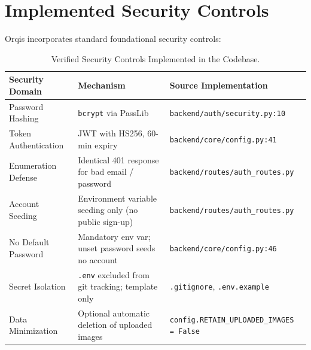 \documentclass[11pt,a4paper]{report}
\newcommand{\artifact}[1]{\nolinkurl{#1}}
\begin{document}
\section{Implemented Security Controls}
Orqis incorporates standard foundational security controls:
\begin{table}[H]
\centering
\small
\setlength{\tabcolsep}{3pt}
\begin{tabularx}{\textwidth}{>{\raggedright\arraybackslash}p{3.0cm} >{\raggedright\arraybackslash}X >{\raggedright\arraybackslash}p{4.2cm}}
\toprule
\textbf{Security Domain} & \textbf{Mechanism} & \textbf{Source Implementation} \\
\midrule
Password Hashing & \texttt{bcrypt} via PassLib & \artifact{backend/auth/security.py:10} \\
Token Authentication & JWT with HS256, 60-min expiry & \artifact{backend/core/config.py:41} \\
Enumeration Defense & Identical 401 response for bad email / password & \artifact{backend/routes/auth\_routes.py} \\
Account Seeding & Environment variable seeding only (no public sign-up) & \artifact{backend/routes/auth\_routes.py} \\
No Default Password & Mandatory env var; unset password seeds no account & \artifact{backend/core/config.py:46} \\
Secret Isolation & \texttt{.env} excluded from git tracking; template only & \artifact{.gitignore}, \artifact{.env.example} \\
Data Minimization & Optional automatic deletion of uploaded images & \artifact{config.RETAIN\_UPLOADED\_IMAGES = False} \\
\bottomrule
\end{tabularx}
\caption{Verified Security Controls Implemented in the Codebase.}
\label{tab:security_controls}
\end{table}
\end{document}
